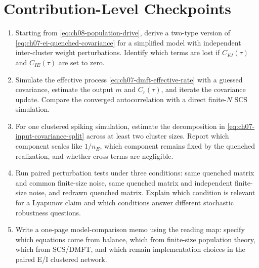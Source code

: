 \section{Contribution-Level Checkpoints}
\label{sec:ch07-contribution-checkpoints}

\begin{enumerate}
    \item Starting from \cref{eq:ch08-population-drive}, derive a two-type
    version of \cref{eq:ch07-ei-quenched-covariance} for a simplified model
    with independent inter-cluster weight perturbations. Identify which terms
    are lost if \(C_{EI}(\tau)\) and \(C_{IE}(\tau)\) are set to zero.

    \item Simulate the effective process
    \cref{eq:ch07-dmft-effective-rate} with a guessed covariance, estimate the
    output \(m\) and \(C_r(\tau)\), and iterate the covariance update. Compare
    the converged autocorrelation with a direct finite-\(N\) SCS simulation.

    \item For one clustered spiking simulation, estimate the decomposition in
    \cref{eq:ch07-input-covariance-split} across at least two cluster sizes.
    Report which component scales like \(1/n_E\), which component remains
    fixed by the quenched realization, and whether cross terms are negligible.

    \item Run paired perturbation tests under three conditions: same quenched
    matrix and common finite-size noise, same quenched matrix and independent
    finite-size noise, and redrawn quenched matrix. Explain which condition is
    relevant for a Lyapunov claim and which conditions answer different
    stochastic robustness questions.

    \item Write a one-page model-comparison memo using the reading map:
    specify which equations come from balance, which from finite-size
    population theory, which from SCS/DMFT, and which remain implementation
    choices in the paired E/I clustered network.
\end{enumerate}
